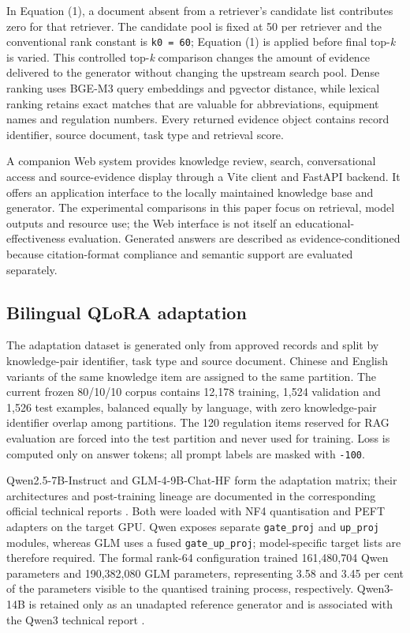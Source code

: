 In Equation (1), a document absent from a retriever's candidate list contributes zero for that retriever. The candidate pool is fixed at 50 per retriever and the conventional rank constant is \texttt{k0 = 60}; Equation (1) is applied before final top-\emph{k} is varied. This controlled top-\emph{k} comparison changes the amount of evidence delivered to the generator without changing the upstream search pool. Dense ranking uses BGE-M3 query embeddings and pgvector distance, while lexical ranking retains exact matches that are valuable for abbreviations, equipment names and regulation numbers. Every returned evidence object contains record identifier, source document, task type and retrieval score.

A companion Web system provides knowledge review, search, conversational access and source-evidence display through a Vite client and FastAPI backend. It offers an application interface to the locally maintained knowledge base and generator. The experimental comparisons in this paper focus on retrieval, model outputs and resource use; the Web interface is not itself an educational-effectiveness evaluation. Generated answers are described as evidence-conditioned because citation-format compliance and semantic support are evaluated separately.

\subsection{Bilingual QLoRA adaptation}

The adaptation dataset is generated only from approved records and split by knowledge-pair identifier, task type and source document. Chinese and English variants of the same knowledge item are assigned to the same partition. The current frozen 80/10/10 corpus contains 12,178 training, 1,524 validation and 1,526 test examples, balanced equally by language, with zero knowledge-pair identifier overlap among partitions. The 120 regulation items reserved for RAG evaluation are forced into the test partition and never used for training. Loss is computed only on answer tokens; all prompt labels are masked with \texttt{-100}.

Qwen2.5-7B-Instruct and GLM-4-9B-Chat-HF form the adaptation matrix; their architectures and post-training lineage are documented in the corresponding official technical reports \citep{qwen2024technical,glm2024chatglm}. Both were loaded with NF4 quantisation and PEFT adapters on the target GPU. Qwen exposes separate \texttt{gate\_proj} and \texttt{up\_proj} modules, whereas GLM uses a fused \texttt{gate\_up\_proj}; model-specific target lists are therefore required. The formal rank-64 configuration trained 161,480,704 Qwen parameters and 190,382,080 GLM parameters, representing 3.58 and 3.45 per cent of the parameters visible to the quantised training process, respectively. Qwen3-14B is retained only as an unadapted reference generator and is associated with the Qwen3 technical report \citep{qwen2025technical}.

